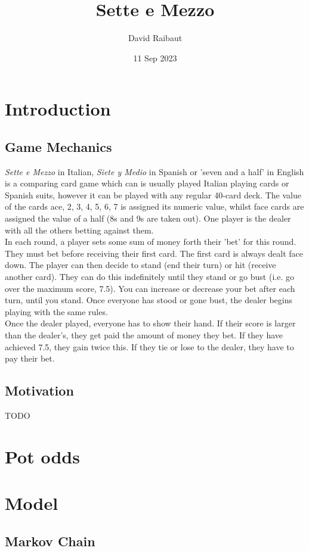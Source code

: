 \documentclass[12pt]{article}
\title{Sette e Mezzo}
\author{David Raibaut}
\date{11 Sep 2023}
\begin{document}
\maketitle
\newpage

\section{Introduction}
\subsection{Game Mechanics}
\textit{Sette e Mezzo} in Italian, \textit{Siete y Medio} in Spanish or 'seven and a half'
in English is a comparing card game which can is usually played Italian playing cards or Spanish
suits, however it can be played with any regular 40-card deck. The value of the cards ace, 2, 3, 4, 5, 6, 7 is assigned
its numeric value, whilst face cards are assigned the value of a half (8s and 9s are taken out).
One player is the dealer with all the others betting against them.
\\
In each round, a player sets some sum of money forth their 'bet' for this round. They must bet before receiving their first card.
The first card is always dealt face down. The player can then decide to stand (end their turn) or hit (receive another card).
They can do this indefinitely until they stand or go bust (i.e. go over the maximum score, 7.5). You can increase or decrease your bet
after each turn, until you stand. Once everyone has stood or gone bust, the dealer begins playing with the same rules.
\\
Once the dealer played, everyone has to show their hand. If their score is larger than the dealer's, they get paid the amount of money they bet.
If they have achieved 7.5, they gain twice this. If they tie or lose to the dealer, they have to pay their bet.
\subsection{Motivation}
TODO
\section{Pot odds}

\section{Model}
\subsection{Markov Chain}
\end{document}
